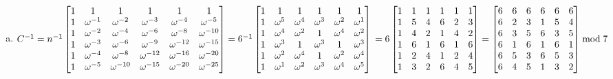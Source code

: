 \documentclass[11pt]{article}
\begin{document}
\begin{enumerate}[(a)]
\item $C^{-1}=n^{-1}\begin{bmatrix}1&1&1&1&1&1\\1&\omega^{-1}&\omega^{-2}&\omega^{-3}&\omega^{-4}&\omega^{-5}\\1&\omega^{-2}&\omega^{-4}&\omega^{-6}&\omega^{-8}&\omega^{-10}\\1&\omega^{-3}&\omega^{-6}&\omega^{-9}&\omega^{-12}&\omega^{-15}\\1&\omega^{-4}&\omega^{-8}&\omega^{-12}&\omega^{-16}&\omega^{-20}\\1&\omega^{-5}&\omega^{-10}&\omega^{-15}&\omega^{-20}&\omega^{-25}\end{bmatrix} = 6^{-1}\begin{bmatrix}1&1&1&1&1&1\\1&\omega^5&\omega^4&\omega^3&\omega^2&\omega^1\\1&\omega^4&\omega^2&1&\omega^4&\omega^2\\1&\omega^3&1&\omega^3&1&\omega^3\\1&\omega^2&\omega^4&1&\omega^2&\omega^4\\1&\omega^1&\omega^2&\omega^3&\omega^4&\omega^5\end{bmatrix} \\ =6\begin{bmatrix}1&1&1&1&1&1\\1&5&4&6&2&3\\1&4&2&1&4&2\\1&6&1&6&1&6\\1&2&4&1&2&4\\1&3&2&6&4&5\end{bmatrix} = \begin{bmatrix}6&6&6&6&6&6\\6&2&3&1&5&4\\6&3&5&6&3&5\\6&1&6&1&6&1\\6&5&3&6&5&3\\6&4&5&1&3&2\end{bmatrix}\bmod 7$ \\

\end{enumerate}
\end{document}
